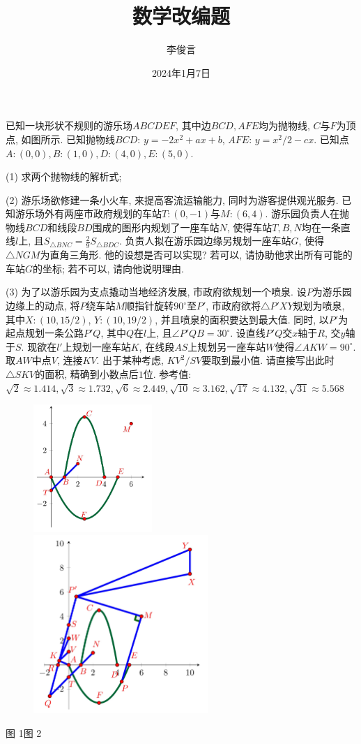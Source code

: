 \documentclass{article}
\title{数学改编题}
\author{李俊言}
\date{2024年1月7日}
\begin{document}
已知一块形状不规则的游乐场$ABCDEF$, 其中边$BCD, AFE$均为抛物线, $C$与$F$为顶点, 如图所示. 已知抛物线$BCD$: $y=-2x^2+ax+b$, $AFE$: $y=x^2/2-cx$. 已知点$A:(0,0), B:(1,0), D:(4,0), E:(5,0)$.\par
(1) 求两个抛物线的解析式;\par
(2) 游乐场欲修建一条小火车, 来提高客流运输能力, 同时为游客提供观光服务. 已知游乐场外有两座市政府规划的车站$T:(0,-1)$与$M:(6,4)$. 游乐园负责人在抛物线$BCD$和线段$BD$围成的图形内规划了一座车站$N$, 使得车站$T, B, N$均在一条直线$l$上, 且$S_{\triangle BNC}=\frac{2}{9}S_{\triangle BDC}$. 负责人拟在游乐园边缘另规划一座车站$G$, 使得$\triangle NGM$为直角三角形. 他的设想是否可以实现? 若可以, 请协助他求出所有可能的车站$G$的坐标; 若不可以, 请向他说明理由.\par
(3) 为了以游乐园为支点撬动当地经济发展, 市政府欲规划一个喷泉. 设$P$为游乐园边缘上的动点, 将$P$绕车站$M$顺指针旋转$90^\circ$至$P'$, 市政府欲将$\triangle P'XY$规划为喷泉, 其中$X:(10,15/2)$, $Y:(10,19/2)$, 并且喷泉的面积要达到最大值. 同时, 以$P'$为起点规划一条公路$P'Q$, 其中$Q$在$l$上, 且$\angle P'QB=30^\circ$. 设直线$P'Q$交$x$轴于$R$, 交$y$轴于$S$. 现欲在$l'$上规划一座车站$K$, 在线段$AS$上规划另一座车站$W$使得$\angle AKW=90^\circ$. 取$AW$中点$V$, 连接$KV$. 出于某种考虑, $KV^2/SV$要取到最小值. 请直接写出此时$\triangle SKV$的面积, 精确到小数点后$1$位. 参考值:$\sqrt{2}\approx1.414,\sqrt{3}\approx1.732,\sqrt{6}\approx2.449,\sqrt{10}\approx3.162,\sqrt{17}\approx4.132,\sqrt{31}\approx5.568$
\begin{figure}[H]
\includegraphics[width=0.4\textwidth]{1.jpg}
\hfill
\includegraphics[width=0.59\textwidth]{2.jpg}
\end{figure}
\hspace*{0.15\textwidth}图 1\hfill 图 2\hspace{0.25\textwidth}
\end{document}

